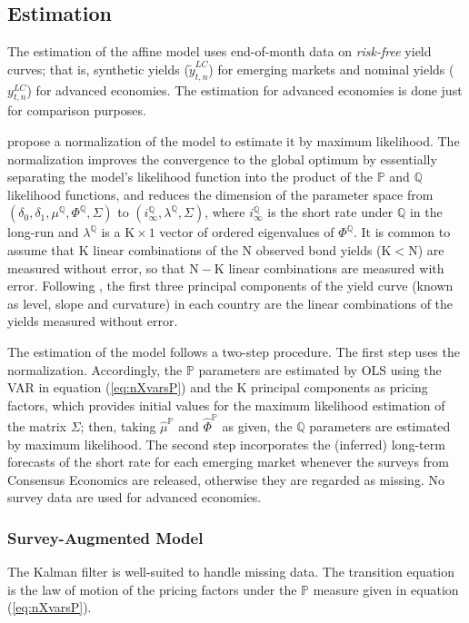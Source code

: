 \documentclass[a4paper, 12pt]{article}
\providecommand{\tnr}{n}
\providecommand{\idxt}{t}
\providecommand{\idxs}{\idxt,\tnr}
\providecommand{\yld}{y}
\providecommand{\srate}{i}
\providecommand{\yLCnom}{\yld_{\idxs} ^{LC}}
\providecommand{\yLCsynt}{\widetilde{\yld}_{\idxs} ^{LC}}
\providecommand{\Xdim}{\mathrm{K}}
\providecommand{\Ydim}{\mathrm{N}}
\providecommand{\Pmeasure}{\mathbb{P}}
\providecommand{\Qmeasure}{\mathbb{Q}}
\providecommand{\deltazero}{\delta_{0}}
\providecommand{\deltaone}{\delta_{1}}
\providecommand{\XmuQ}{\mu^{\Qmeasure}}
\providecommand{\XSigma}{\Sigma}
\providecommand{\XPhiQ}{\Phi^{\Qmeasure}}
\providecommand{\Xmu}{\mu}
\providecommand{\XPhi}{\Phi}
\begin{document}
\subsection{Estimation} \label{sec:Estimation}
The estimation of the affine model uses end-of-month data on \textit{risk-free} yield curves; that is, synthetic yields (\(\yLCsynt\)) for emerging markets and nominal yields (\(\yLCnom\)) for advanced economies. The estimation for advanced economies is done just for comparison purposes. 

\cite{JSZ:2011} propose a normalization of the model to estimate it by maximum likelihood. The normalization improves the convergence to the global optimum by essentially separating the model's likelihood function into the product of the \(\Pmeasure\) and \(\Qmeasure\) likelihood functions, and reduces the dimension of the parameter space from \((\deltazero, \deltaone, \XmuQ, \XPhiQ, \XSigma)\) to \((\srate^{\Qmeasure}_{\infty}, \lambda^{\Qmeasure},\XSigma)\), where \(\srate^{\Qmeasure}_{\infty}\) is the short rate under \(\Qmeasure\) in the long-run and \(\lambda^{\Qmeasure}\) is a \(\Xdim \times 1\) vector of ordered eigenvalues of \(\XPhiQ\). It is common to assume that \(\Xdim\) linear combinations of the \(\Ydim\) observed bond yields (\(\Xdim < \Ydim\)) are measured without error, so that \(\Ydim - \Xdim\) linear combinations are measured with error. Following \cite{JSZ:2011}, the first three principal components of the yield curve (known as level, slope and curvature) in each country are the linear combinations of the yields measured without error. 

The estimation of the model follows a two-step procedure. The first step uses the \cite{JSZ:2011} normalization. Accordingly, the \(\Pmeasure\) parameters are estimated by OLS using the VAR in equation (\ref{eq:nXvarsP}) and the \(\Xdim\) principal components as pricing factors, which provides initial values for the maximum likelihood estimation of the matrix \(\XSigma\); then, taking \(\widehat{\Xmu}^{\Pmeasure}\) and \(\widehat{\XPhi}^{\Pmeasure}\) as given, the \(\Qmeasure\) parameters are estimated by maximum likelihood. %
The second step incorporates the (inferred) long-term forecasts of the short rate for each emerging market whenever the surveys from Consensus Economics are released, otherwise they are regarded as missing. No survey data are used for advanced economies.  

\subsubsection{Survey-Augmented Model} \label{sec:sATSM}
The Kalman filter is well-suited to handle missing data. The transition equation is the law of motion of the pricing factors under the \(\Pmeasure\) measure given in equation (\ref{eq:nXvarsP}). 
\end{document}
